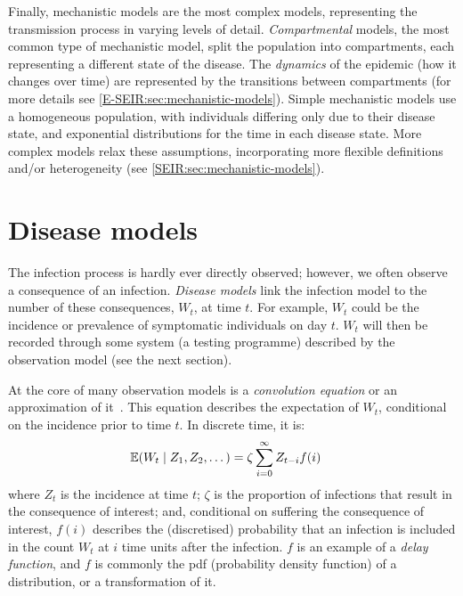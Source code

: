 \documentclass[thesis.tex]{subfiles}
\begin{document}
Finally, mechanistic models are the most complex models, representing the transmission process in varying levels of detail.
\emph{Compartmental} models, the most common type of mechanistic model, split the population into compartments, each representing a different state of the disease.
The \emph{dynamics} of the epidemic (how it changes over time) are represented by the transitions between compartments (for more details see \cref{E-SEIR:sec:mechanistic-models}).
Simple mechanistic models use a homogeneous population, with individuals differing only due to their disease state, and exponential distributions for the time in each disease state.
More complex models relax these assumptions, incorporating more flexible definitions and/or heterogeneity (see \cref{SEIR:sec:mechanistic-models}).

\section{Disease models} \label{intro:sec:disease-model}

The infection process is hardly ever directly observed; however, we often observe a consequence of an infection.
\emph{Disease models} link the infection model to the number of these consequences, $W_t$, at time $t$.
For example, $W_t$ could be the incidence or prevalence of symptomatic individuals on day $t$.
$W_t$ will then be recorded through some system (\eg a testing programme) described by the observation model (see the next section).

At the core of many observation models is a \emph{convolution equation} or an approximation of it~\autocite[e.g.][]{brookmeyerBackcalculation,abbottEstimating,birrellBayesian}.
This equation describes the expectation of $W_t$, conditional on the incidence prior to time $t$.
In discrete time, it is:
\begin{align}
    \operatorname{\mathbb{E}}(W_t \mid Z_1, Z_2, \dots) &= \zeta \sum_{i=0}^\infty Z_{t-i} f(i)
    \label{intro:eq:disease-model}
\end{align}
where $Z_t$ is the incidence at time $t$; $\zeta$ is the proportion of infections that result in the consequence of interest; and, conditional on suffering the consequence of interest, $f(i)$ describes the (discretised) probability that an infection is included in the count $W_t$ at $i$ time units after the infection.
$f$ is an example of a \emph{delay function}, and $f$ is commonly the pdf (probability density function) of a distribution, or a transformation of it.
\end{document}
